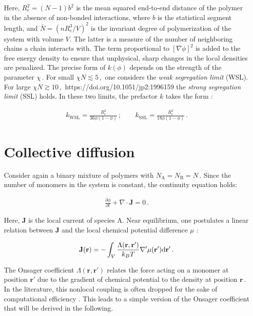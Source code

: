 \documentclass[bachelor,       %
               twoside,        %
               BCOR10mm,       %
                ngerman,english  %
               ]{GAUBM}
\begin{document}
Here, $R_e^2=(N-1)b^2$ is the mean squared end-to-end distance of the polymer in the absence of non-bonded interactions, where $b$ is the statistical segment length, and $\bar N=\left(nR_e^3/V\right)^2$ is the invariant degree of polymerization of the system with volume $V$. The latter is a measure of the number of neighboring chains a chain interacts with. The term proportional to $[\nabla\phi]^2$ is added to the free energy density to ensure that unphysical, sharp changes in the local densities are penalized. The precise form of $k(\phi)$ depends on the strength of the parameter $\chi\,$. For small $\chi N\lesssim 5\,,$ one considers the \textit{weak segregation limit} (WSL). For large $\chi N\gtrsim10\,,$ {https://doi.org/10.1051/jp2:1996159} the \textit{strong segregation limit} (SSL) holds. In these two limits, the prefactor $k$ takes the form \cite{Reister02}:

\begin{align}
  k_\mathrm{WSL}=\frac{R_e^2}{36\phi(1-\phi)}\,;\qquad k_\mathrm{SSL}=\frac{R_e^2}{18\phi(1-\phi)}\,.
\end{align}


\section{Collective diffusion}

Consider again a binary mixture of polymers with $N_\mathrm A=N_\mathrm B=N\,$. Since the number of monomers in the system is constant, the continuity equation holds:

\begin{align}
  \frac{\partial\phi}{\partial t}+\nabla\cdot\mathbf{J}=0\,.
  \label{eq:conti}
\end{align}

Here, $\mathbf{J}$ is the local current of species A. Near equilibrium, one postulates a linear relation between $\mathbf J$ and the local chemical potential difference $\mu$ \cite{deGennes80}:


\begin{align}
    \mathbf J(\mathbf{r})=-\int_V\frac{\Lambda(\mathbf{r}, \mathbf{r'})}{k_BT}\nabla '\mu(\mathbf{r'})\text d \mathbf{r'}\,.
    \label{eq:current}
\end{align}

The Onsager coefficient $\Lambda(\mathbf{r}, \mathbf{r'})$ relates the force acting on a monomer at position $\mathbf{r'}$ due to the gradient of chemical potential to the density at position $\mathbf{r}\,$. In the literature, this nonlocal coupling is often dropped for the sake of computational efficiency \cite{Fraaje97,deGennes80,Binder83}. This leads to a simple version of the Onsager coefficient that will be derived in the following. 
\end{document}
